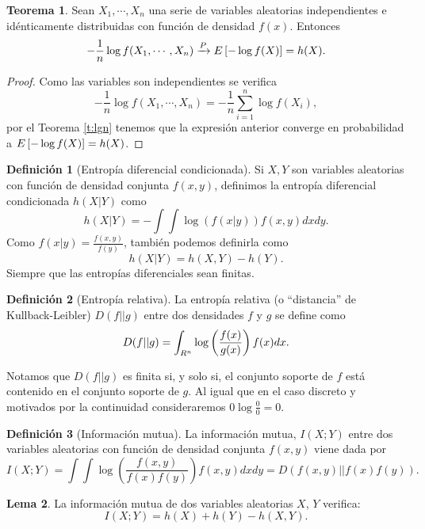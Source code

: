 \documentclass[10pt,a4paper]{article} %
\let\mathbb\relax
\theoremstyle{definition}
\newtheorem{definition}{Definición}[section]
\newtheorem{theorem}{Teorema}[section]
\newtheorem{lemma}[theorem]{Lema}
\begin{document}
\begin{theorem}
  Sean $X_1,\cdots, X_n$ una serie de variables aleatorias independientes e idénticamente distribuidas con función de densidad $f(x)$. Entonces\[
-\frac{1}{n}\log f(X_1,\cdots, X_n) \xrightarrow[]{P} \mathbb{E}\left [ - \log f(X) \right ] = h(X).
  \]
\end{theorem}

\begin{proof}
  Como las variables son independientes se verifica\[
-\frac{1}{n}\log f(X_1,\cdots, X_n) = - \frac{1}{n} \sum_{i=1}^n \log f(X_i),
\]
por el Teorema \ref{t:lgn} tenemos que la expresión anterior converge en probabilidad a $\mathbb{E}\left [ - \log f(X) \right ] = h(X)$.
\end{proof}


\begin{definition}[Entropía diferencial condicionada]
  Si $X,Y$ son variables aleatorias con función de densidad conjunta $f(x,y)$, definimos la entropía diferencial condicionada $h(X|Y)$ como\[
h(X|Y) = -\int\int  \log \left(f(x|y)\right) f(x,y) dxdy.
\]
Como $f(x|y) = \frac{f(x,y)}{f(y)}$, también podemos definirla como\[
h(X|Y) = h(X,Y) - h(Y).
\]
Siempre que las entropías diferenciales sean finitas.
\end{definition}

\begin{definition}[Entropía relativa]
  La entropía relativa (o ``distancia'' de Kullback-Leibler) $D(f||g)$ entre dos densidades $f$ y $g$ se define como \[
D(f||g) = \int_{\mathbb{R}^n} \log\left( \frac{f(x)}{g(x)}\right)f(x) dx.
  \]
\end{definition}

Notamos que $D(f||g)$ es finita si, y solo si, el conjunto soporte de $f$ está contenido en el conjunto soporte de $g$. 
Al igual que en el caso discreto y motivados por la continuidad consideraremos $0\log\frac{0}{0} = 0$.\\

\begin{definition}[Información mutua]
  La información mutua, $I(X;Y)$ entre dos variables aleatorias con función de densidad conjunta $f(x,y)$ viene dada por\[
I(X;Y) = \int \int \log \left(\frac{f(x,y)}{f(x)f(y)}\right)f(x,y) dxdy = D(f(x,y)||f(x)f(y)).
  \]
\end{definition}

\begin{lemma}\label{l:ent_im}
  La información mutua de dos variables aleatorias $X$, $Y$ verifica:\[
  I(X;Y) = h(X) + h(Y) - h(X,Y).
  \]
\end{lemma}
\end{document}
